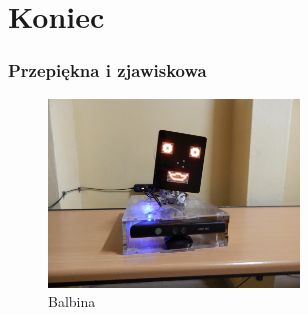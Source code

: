 \documentclass[xcolor=dvipsnames]{beamer}%
\begin{document}
\section{Koniec}
\begin{frame}
	\frametitle{Przepiękna i zjawiskowa}
	\centering \begin{figure}
		\includegraphics[height=5cm]{figure/balbina.jpg}
		\caption{Balbina}
	\end{figure}
\end{frame}
\end{document}
